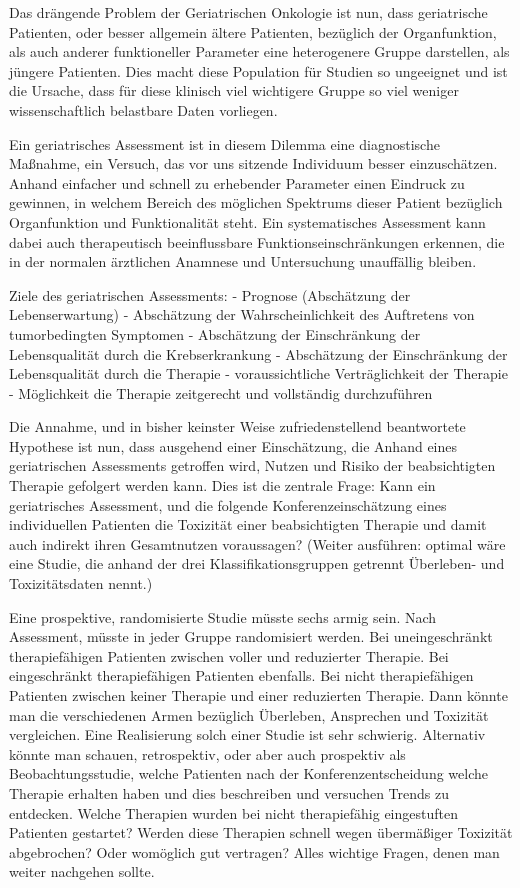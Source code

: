 Das drängende Problem der Geriatrischen Onkologie ist nun, dass
geriatrische Patienten, oder besser allgemein ältere Patienten,
bezüglich der Organfunktion, als auch anderer funktioneller Parameter
eine heterogenere Gruppe darstellen, als jüngere Patienten. Dies macht
diese Population für Studien so ungeeignet und ist die Ursache, dass
für diese klinisch viel wichtigere Gruppe so viel weniger
wissenschaftlich belastbare Daten vorliegen.

Ein geriatrisches Assessment ist in diesem Dilemma eine diagnostische
Maßnahme, ein Versuch, das vor uns sitzende Individuum besser
einzuschätzen. Anhand einfacher und schnell zu erhebender Parameter
einen Eindruck zu gewinnen, in welchem Bereich des möglichen Spektrums
dieser Patient bezüglich Organfunktion und Funktionalität steht. Ein
systematisches Assessment kann dabei auch therapeutisch beeinflussbare
Funktionseinschränkungen erkennen, die in der normalen ärztlichen
Anamnese und Untersuchung unauffällig bleiben.

Ziele des geriatrischen Assessments:
- Prognose (Abschätzung der Lebenserwartung)
- Abschätzung der Wahrscheinlichkeit des Auftretens von tumorbedingten
Symptomen
- Abschätzung der Einschränkung der Lebensqualität durch die Krebserkrankung
- Abschätzung der Einschränkung der Lebensqualität durch die Therapie
- voraussichtliche Verträglichkeit der Therapie
- Möglichkeit die Therapie zeitgerecht und vollständig durchzuführen

Die Annahme, und in bisher keinster Weise zufriedenstellend
beantwortete Hypothese ist nun, dass ausgehend einer Einschätzung, die
Anhand eines geriatrischen Assessments getroffen wird, Nutzen und
Risiko der beabsichtigten Therapie gefolgert werden kann. Dies ist die
zentrale Frage: Kann ein geriatrisches Assessment, und die folgende
Konferenzeinschätzung eines individuellen Patienten die Toxizität
einer beabsichtigten Therapie und damit auch indirekt ihren
Gesamtnutzen voraussagen? (Weiter ausführen: optimal wäre eine Studie,
die anhand der drei Klassifikationsgruppen getrennt Überleben- und
Toxizitätsdaten nennt.)

Eine prospektive, randomisierte Studie müsste sechs armig sein. Nach
Assessment, müsste in jeder Gruppe randomisiert werden. Bei
uneingeschränkt therapiefähigen Patienten zwischen voller und
reduzierter Therapie. Bei eingeschränkt therapiefähigen Patienten
ebenfalls. Bei nicht therapiefähigen Patienten zwischen keiner
Therapie und einer reduzierten Therapie. Dann könnte man die
verschiedenen Armen bezüglich Überleben, Ansprechen und Toxizität
vergleichen. Eine Realisierung solch einer Studie ist sehr schwierig.
Alternativ könnte man schauen, retrospektiv, oder aber auch prospektiv
als Beobachtungsstudie, welche Patienten nach der
Konferenzentscheidung welche Therapie erhalten haben und dies
beschreiben und versuchen Trends zu entdecken. Welche Therapien wurden
bei nicht therapiefähig eingestuften Patienten gestartet? Werden diese
Therapien schnell wegen übermäßiger Toxizität abgebrochen? Oder
womöglich gut vertragen? Alles wichtige Fragen, denen man weiter
nachgehen sollte.

